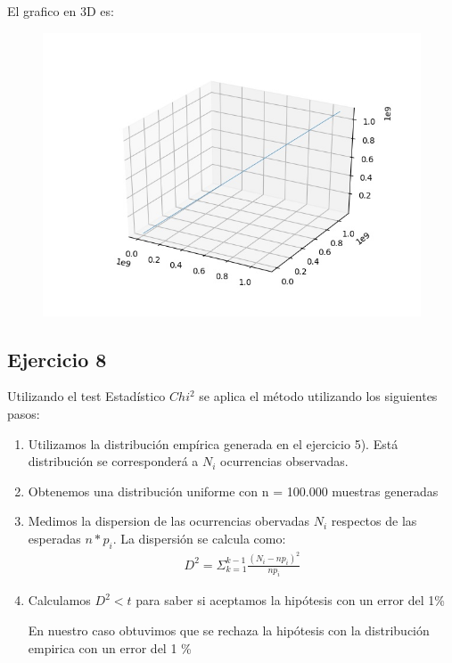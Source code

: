 \documentclass[11pt,a4paper]{article}
\begin{document}
		El grafico en 3D es:
		\begin{figure}[H]
  			\centering
    			\includegraphics[width=14cm]{imagenes/histogramaEjer73d}
		\end{figure}

	\subsection{Ejercicio 8}
	Utilizando el test Estadístico $Chi^2$ se aplica el método utilizando los siguientes pasos:
	\begin{enumerate}
		\item Utilizamos la distribución empírica generada en el ejercicio 5). Está distribución se corresponderá a $N_i$ ocurrencias observadas.
		\item Obtenemos una distribución uniforme con n = 100.000 muestras generadas
		\item Medimos la dispersion de las ocurrencias obervadas $N_i$ respectos de las esperadas $n*p_i$. La dispersión se calcula como:
		\begin{align*}
		D^2 = \Sigma_{k=1}^{k-1} \frac{(N_i - np_i)^2}{np_i}
		\end{align*}
		\item Calculamos $D^2 < t$ para saber si aceptamos la hipótesis  con un error del 1\%
		
		En nuestro caso obtuvimos que se rechaza la hipótesis con la distribución empirica con un error del 1 \%
	\end{enumerate}
\end{document}
